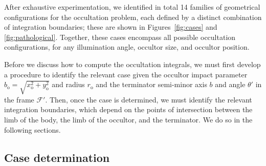 \documentclass[modern]{aastex62}
\begin{document}
After exhaustive experimentation, we identified in total 14 families of
geometrical configurations for the occultation problem,
each defined by a distinct combination of integration
boundaries; these are shown in Figures~\ref{fig:cases} and
\ref{fig:pathological}.
Together, these cases encompass all possible
occultation configurations, for any illumination angle, occultor size, and
occultor position.

Before we discuss how to compute the occultation integrals, we must first
develop a procedure to identify the relevant case given the occultor
impact parameter $b_\mathrm{o} = \sqrt{x_\mathrm{o}^2 + y_\mathrm{o}^2}$ and radius $r_\mathrm{o}$ and
the terminator semi-minor
axis $b$ and angle $\theta'$ in the frame $\mathcal{F}'$.
Then, once the case is determined, we must
identify the relevant integration boundaries, which depend on the points
of intersection between the limb of the body, the limb of the occultor, and
the terminator. We do so in the following sections.

%

\subsection{Case determination}
\label{sec:which-case}
\end{document}
